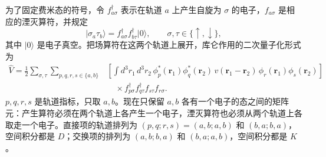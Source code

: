 \documentclass[UTF8,11pt,a4paper,fontset=fandol]{ctexart}
\newcommand{\ket}[1]{\lvert #1\rangle}
\begin{document}
为了固定费米态的符号，令 $f^\dagger_{a\sigma}$ 表示在轨道 $a$ 上产生自旋为 $\sigma$ 的电子，$f_{a\sigma}$ 是相应的湮灭算符，并规定
\begin{equation}
\ket{\sigma_a\tau_b}
=f^\dagger_{a\sigma}f^\dagger_{b\tau}\ket{0},
\qquad \sigma,\tau\in\{\uparrow,\downarrow\},
\end{equation}
其中 $\ket{0}$ 是电子真空。把场算符在这两个轨道上展开，库仑作用的二次量子化形式为
\begin{equation}
\begin{aligned}
\hat V=\frac12\sum_{\sigma,\tau}\sum_{p,q,r,s\in\{a,b\}}
&\left[\int d^3r_1\,d^3r_2\,
\phi_p^*(\mathbf r_1)\phi_q^*(\mathbf r_2)\,
v(\mathbf r_1-\mathbf r_2)\,
\phi_r(\mathbf r_1)\phi_s(\mathbf r_2)\right]\\
&\hspace{1em}\times
f^\dagger_{p\sigma}f^\dagger_{q\tau}f_{s\tau}f_{r\sigma}.
\end{aligned}
\end{equation}
$p,q,r,s$ 是轨道指标，只取 $a,b$。现在只保留 $a,b$ 各有一个电子的态之间的矩阵元：产生算符必须在两个轨道上各产生一个电子，湮灭算符也必须从两个轨道上各取走一个电子。直接项的轨道排列为 $(p,q;r,s)=(a,b;a,b)$ 和 $(b,a;b,a)$，空间积分都是 $D$；交换项的排列为 $(a,b;b,a)$ 和 $(b,a;a,b)$，空间积分都是 $K$。
\end{document}
